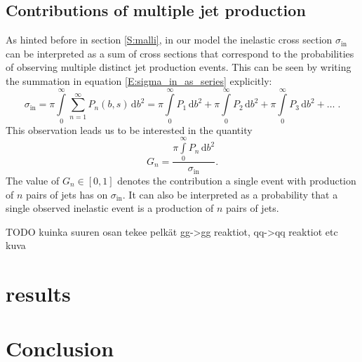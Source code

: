 \documentclass[a4paper, twoside, english, 12pt]{article}
\begin{document}
\subsection{Contributions of multiple jet production}

As hinted before in section \ref{S:malli}, in our model the inelastic cross section $\sigma_{\text{in}}$ can be interpreted as a sum of cross sections that correspond to the probabilities of observing multiple distinct jet production events. This can be seen by writing the summation in equation \eqref{E:sigma_in_as_series} explicitly:
\begin{equation}
	\sigma_\text{in} =  \pi\int\limits_0^\infty \sum\limits_{n=1}^\infty P_n(b,s)\, \text{d}b^2 = \pi\int\limits_0^\infty P_1\, \text{d}b^2 + \pi\int\limits_0^\infty P_2\, \text{d}b^2 + \pi\int\limits_0^\infty P_3\, \text{d}b^2 +\ldots \; .
\end{equation}
This observation leads us to be interested in the quantity
\begin{equation}
	G_n = \frac{\pi\int\limits_0^\infty P_n\, \text{d}b^2}{\sigma_\text{in}}.
\end{equation}
The value of $G_n\in [0,1]$ denotes the contribution a single event with production of $n$ pairs of jets has on $\sigma_\text{in}$. It can also be interpreted as a probability that a single observed inelastic event is a production of $n$ pairs of jets.



TODO kuinka suuren osan tekee pelkät gg->gg reaktiot, qq->qq reaktiot etc kuva

\section{results}

\section{Conclusion}



\newpage
\nocite{*}
\label{lastpage}
\appendix
\newpage
\end{document}
